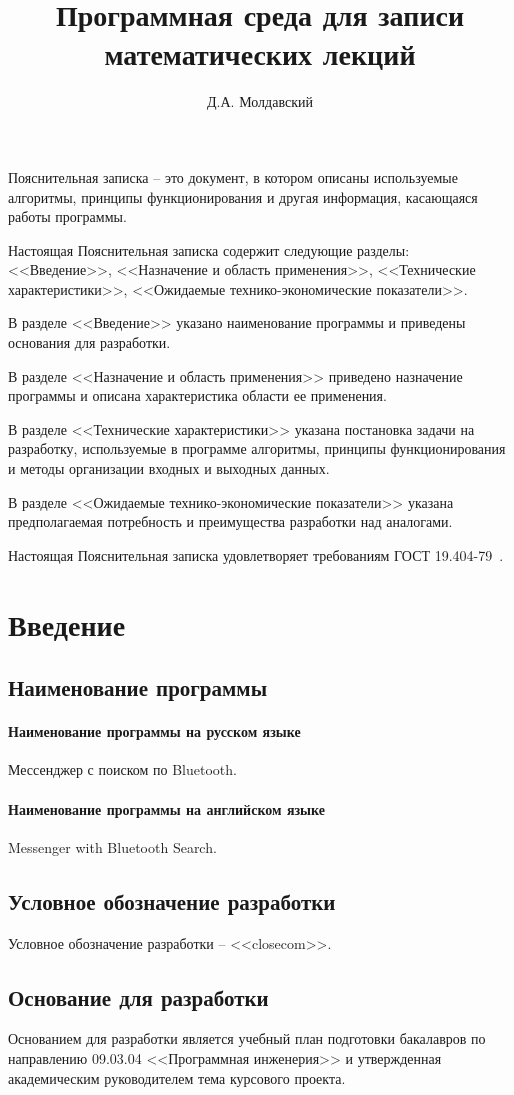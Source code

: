 \documentclass[explnote]{espd}
\author{Д.А. Молдавский}
\title{Программная среда для записи\\математических лекций}
\begin{document}
\annotation
Пояснительная записка -- это документ, в котором описаны используемые алгоритмы, принципы функционирования и другая информация, касающаяся работы программы.

Настоящая Пояснительная записка содержит следующие разделы: <<Введение>>, <<Назначение и область применения>>, <<Технические характеристики>>, <<Ожидаемые технико-экономические показатели>>.

В разделе <<Введение>> указано наименование программы и приведены основания для разработки.

В разделе <<Назначение и область применения>> приведено назначение программы и описана характеристика области ее применения.

В разделе <<Технические характеристики>> указана постановка задачи на разработку, используемые в программе алгоритмы, принципы функционирования и методы организации входных и выходных данных.

В разделе <<Ожидаемые технико-экономические показатели>> указана предполагаемая потребность и преимущества разработки над аналогами.

Настоящая Пояснительная записка удовлетворяет требованиям ГОСТ 19.404-79~\cite{espd404}.

\tableofcontents

\section{Введение}
\subsection{Наименование программы}
\paragraph{Наименование программы на русском языке}
Мессенджер с поиском по Bluetooth.
\paragraph{Наименование программы на английском языке}
Messenger with Bluetooth Search.

\subsection{Условное обозначение разработки}
Условное обозначение разработки -- <<closecom>>.

\subsection{Основание для разработки}
Основанием для разработки является учебный план подготовки бакалавров по направлению 09.03.04 <<Программная инженерия>> и утвержденная академическим руководителем тема курсового проекта.
\end{document}
